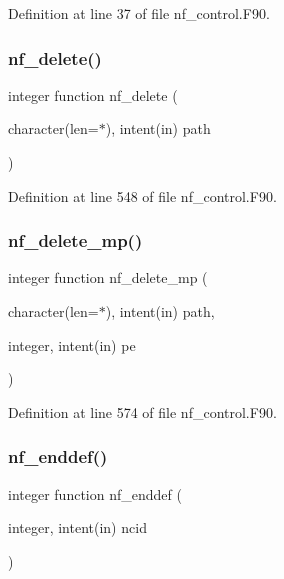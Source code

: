 Definition at line 37 of file nf\+\_\+control.\+F90.

\mbox{\label{nf__control_8F90_aa8ac9a1fb64e51a1ca98b3871df9d3f9}} 
\subsubsection{\texorpdfstring{nf\+\_\+delete()}{nf\_delete()}}
{\footnotesize\ttfamily integer function nf\+\_\+delete (\begin{DoxyParamCaption}\item[{character(len=$\ast$), intent(in)}]{path }\end{DoxyParamCaption})}



Definition at line 548 of file nf\+\_\+control.\+F90.

\mbox{\label{nf__control_8F90_a7731f60779d4069c3098477bc964a292}} 
\subsubsection{\texorpdfstring{nf\+\_\+delete\+\_\+mp()}{nf\_delete\_mp()}}
{\footnotesize\ttfamily integer function nf\+\_\+delete\+\_\+mp (\begin{DoxyParamCaption}\item[{character(len=$\ast$), intent(in)}]{path,  }\item[{integer, intent(in)}]{pe }\end{DoxyParamCaption})}



Definition at line 574 of file nf\+\_\+control.\+F90.

\mbox{\label{nf__control_8F90_a89fd8e80dbeb15cd4d31e6ef638022bc}} 
\subsubsection{\texorpdfstring{nf\+\_\+enddef()}{nf\_enddef()}}
{\footnotesize\ttfamily integer function nf\+\_\+enddef (\begin{DoxyParamCaption}\item[{integer, intent(in)}]{ncid }\end{DoxyParamCaption})}



